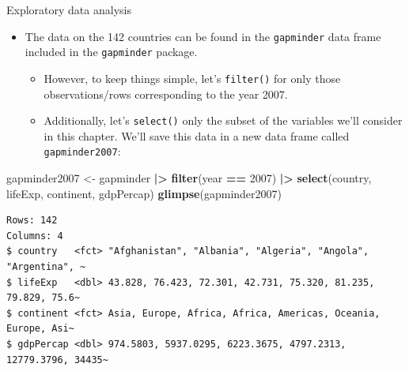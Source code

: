 \documentclass[
  ignorenonframetext,
]{beamer}
\newenvironment{Shaded}{\begin{snugshade}}{\end{snugshade}}
\newcommand{\DecValTok}[1]{\textcolor[rgb]{0.00,0.00,0.81}{#1}}
\newcommand{\FunctionTok}[1]{\textcolor[rgb]{0.13,0.29,0.53}{\textbf{#1}}}
\newcommand{\NormalTok}[1]{#1}
\newcommand{\OtherTok}[1]{\textcolor[rgb]{0.56,0.35,0.01}{#1}}
\newcommand{\SpecialCharTok}[1]{\textcolor[rgb]{0.81,0.36,0.00}{\textbf{#1}}}
\providecommand{\tightlist}{%
  \setlength{\itemsep}{0pt}\setlength{\parskip}{0pt}}
\begin{document}
\begin{frame}[fragile]{Exploratory data analysis}
\label{exploratory-data-analysis}
\begin{itemize}
\item
  The data on the 142 countries can be found in the \texttt{gapminder}
  data frame included in the \texttt{gapminder} package.

  \begin{itemize}
  \tightlist
  \item
    However, to keep things simple, let's \texttt{filter()} for only
    those observations/rows corresponding to the year 2007.
  \item
    Additionally, let's \texttt{select()} only the subset of the
    variables we'll consider in this chapter. We'll save this data in a
    new data frame called \texttt{gapminder2007}:
  \end{itemize}
\end{itemize}

\small

\begin{Shaded}
\begin{Highlighting}[]
\NormalTok{gapminder2007 }\OtherTok{\textless{}{-}}\NormalTok{ gapminder }\SpecialCharTok{|\textgreater{}} 
  \FunctionTok{filter}\NormalTok{(year }\SpecialCharTok{==} \DecValTok{2007}\NormalTok{) }\SpecialCharTok{|\textgreater{}}
  \FunctionTok{select}\NormalTok{(country, lifeExp, continent, gdpPercap)}
\FunctionTok{glimpse}\NormalTok{(gapminder2007)}
\end{Highlighting}
\end{Shaded}

\begin{verbatim}
Rows: 142
Columns: 4
$ country   <fct> "Afghanistan", "Albania", "Algeria", "Angola", "Argentina", ~
$ lifeExp   <dbl> 43.828, 76.423, 72.301, 42.731, 75.320, 81.235, 79.829, 75.6~
$ continent <fct> Asia, Europe, Africa, Africa, Americas, Oceania, Europe, Asi~
$ gdpPercap <dbl> 974.5803, 5937.0295, 6223.3675, 4797.2313, 12779.3796, 34435~
\end{verbatim}

\normalsize
\end{frame}
\end{document}
